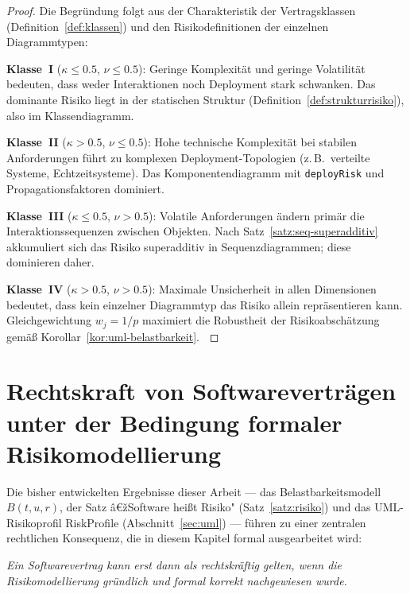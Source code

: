 ﻿\documentclass[a4paper,12pt]{article}
\theoremstyle{definition}
\newenvironment{beweis}{\begin{proof}}{\end{proof}}
\begin{document}
\begin{beweis}
    Die Begr\"undung folgt aus der Charakteristik der Vertragsklassen
    (Definition~\ref{def:klassen}) und den Risikodefinitionen der einzelnen
    Diagrammtypen:

    \textbf{Klasse~I} ($\kappa \leq 0.5$, $\nu \leq 0.5$): Geringe Komplexit\"at
    und geringe Volatili\-t\"at bedeuten, dass weder Interaktionen noch Deployment
    stark schwanken. Das dominante Risiko liegt in der statischen Struktur
    (Definition~\ref{def:strukturrisiko}), also im Klassendiagramm.

    \textbf{Klasse~II} ($\kappa > 0.5$, $\nu \leq 0.5$): Hohe technische Komplexit\"at
    bei stabilen Anforderungen f\"uhrt zu komplexen Deployment-Topologien
    (z.\,B.\ verteilte Systeme, Echtzeitsysteme). Das Komponentendiagramm mit
    \texttt{deployRisk} und Propagationsfaktoren dominiert.

    \textbf{Klasse~III} ($\kappa \leq 0.5$, $\nu > 0.5$): Volatile Anforderungen
    \"andern prim\"ar die Interaktionssequenzen zwischen Objekten. Nach
    Satz~\ref{satz:seq-superadditiv} akkumuliert sich das Risiko superadditiv in
    Sequenzdiagrammen; diese dominieren daher.

    \textbf{Klasse~IV} ($\kappa > 0.5$, $\nu > 0.5$): Maximale Unsicherheit in
    allen Dimensionen bedeutet, dass kein einzelner Diagrammtyp das Risiko allein
    repr\"asentieren kann. Gleichgewichtung $w_j = 1/p$ maximiert die Robustheit
    der Risikoabsch\"atzung gem\"a\ss{} Korollar~\ref{kor:uml-belastbarkeit}.
    $\qedhere$
\end{beweis}

\section{Rechtskraft von Softwarevertr\"agen unter der Bedingung formaler\\
         Risikomodellierung}
\label{sec:rechtskraft}

Die bisher entwickelten Ergebnisse dieser Arbeit --- das Belastbarkeitsmodell
$B(t,u,r)$, der Satz â€žSoftware hei\ss{}t Risiko" (Satz~\ref{satz:risiko}) und das
UML-Risikoprofil \textsf{RiskProfile} (Abschnitt~\ref{sec:uml}) --- f\"uhren zu einer
zentralen rechtlichen Konsequenz, die in diesem Kapitel formal ausgearbeitet wird:

\medskip
\begin{center}
\textit{Ein Softwarevertrag kann erst dann als rechtskr\"aftig gelten, wenn die\\
Risikomodellierung gr\"undlich und formal korrekt nachgewiesen wurde.}
\end{center}
\medskip
\end{document}
